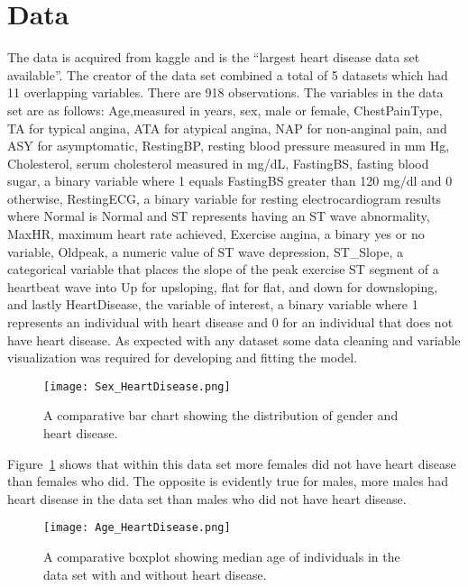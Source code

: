 \documentclass[12pt]{article}
\begin{document}


\section{Data}
\label{sec:data}

The data is acquired from kaggle and is the “largest heart disease data set available”. The creator of the data set combined a total of 5 datasets which had 11 overlapping variables. There are 918 observations. The variables in the data set are as follows: Age,measured in years, sex, male or female, ChestPainType, TA for typical angina, ATA for atypical angina, NAP for non-anginal pain, and ASY for asymptomatic, RestingBP, resting blood pressure measured in mm Hg, Cholesterol, serum cholesterol measured in mg/dL, FastingBS, fasting blood sugar, a binary variable where 1 equals FastingBS greater than 120 mg/dl and 0 otherwise, RestingECG, a binary variable for resting electrocardiogram results where Normal is Normal and ST represents having an ST wave abnormality, MaxHR, maximum heart rate achieved, Exercise angina, a binary yes or no variable, Oldpeak, a numeric value of ST wave depression, ST\_Slope, a categorical variable that places the slope of the peak exercise ST segment of a heartbeat wave into Up for upsloping, flat for flat, and down for downsloping, and lastly HeartDisease, the variable of interest, a binary variable where 1 represents an individual with heart disease and 0 for an individual that does not have heart disease. As expected with any dataset some data cleaning and variable visualization was required for developing and fitting the model. \par
\begin{figure}[tbp]
  \centering
  \texttt{[image: Sex\_HeartDisease.png]}
  \caption{A comparative bar chart showing the distribution of gender and heart disease.}
  \label{fig:heartdisease_and_sex}
\end{figure}
Figure~\ref{fig:heartdisease_and_sex} shows that within this data set more females did not have heart disease than females who did. The opposite is evidently true for males, more males had heart disease in the data set than males who did not have heart disease. 
\begin{figure}[tbp]
  \centering
  \texttt{[image: Age\_HeartDisease.png]}
  \caption{A comparative boxplot showing median age of individuals in the data set with and without heart disease.}
  \label{fig:age_heartdisease}
\end{figure}
\end{document}
